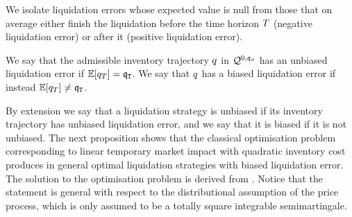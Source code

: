 \documentclass[10pt,a4paper]{article}
\begin{document}
We isolate liquidation errors whose expected value is null from those that on average either finish the liquidation before the time horizon $T$ (negative liquidation error) or after it (positive liquidation error).
\begin{defi}
  We say that the admissible inventory trajectory $q$ in $\mathcal{Q}^{0,\mathfrak{q_0}}$ has an unbiased liquidation error if $\mathbb{{E}}[q_T] = \mathfrak{q}_{\mathtt{T} }$. We say that $q$ has a biased liquidation error if instead $\mathbb{{E}}[q_T] \neq \mathfrak{q}_{\mathtt{T} }$.
\end{defi}

By extension we say that a liquidation strategy is unbiased if its inventory trajectory has unbiased liquidation error, and we say that it is biased if it is not unbiased. 
The next proposition shows that the classical optimisation problem corresponding to linear temporary market impact with quadratic inventory cost produces in general optimal liquidation strategies with biased liquidation error. 
The solution to the optimisation problem is derived from \cite{BMO19opt}. Notice that the statement is general with respect to the distributional assumption of the price process, which is only assumed to be a totally square integrable semimartingale.
\end{document}
